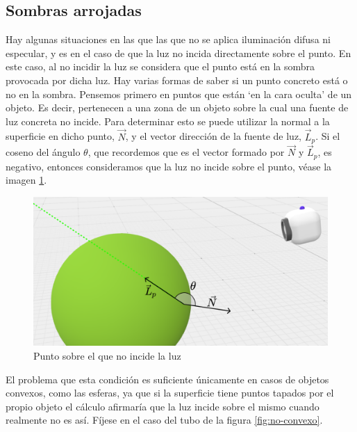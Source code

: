 \subsection{Sombras arrojadas}
\label{subsection:sombras}

Hay algunas situaciones en las que las que no se aplica iluminación difusa ni especular, y es en el caso de que la luz no incida directamente sobre el punto. En este caso, al no incidir la luz se considera que el punto está en la sombra provocada por dicha luz. Hay varias formas de saber si un punto concreto está o no en la sombra. Pensemos primero en puntos que están `en la cara oculta' de un objeto. Es decir, pertenecen a una zona de un objeto sobre la cual una fuente de luz concreta no incide. Para determinar esto se puede utilizar la normal a la superficie en dicho punto, $\vec N$, y el vector dirección de la fuente de luz, $\vec L_p$. Si el coseno del ángulo $\theta$, que recordemos que es el vector formado por $\vec N$ y $\vec L_p$, es negativo, entonces consideramos que la luz no incide sobre el punto, véase la imagen \ref{fig:excepcion}.

\begin{figure} [ht]
    \centering
    \includegraphics[scale = 0.25]{img/C8/excepcion.png}
    \caption{Punto sobre el que no incide la luz}
    \label{fig:excepcion}
\end{figure}

El problema que esta condición es suficiente únicamente en casos de objetos convexos, como las esferas, ya que si la superficie tiene puntos tapados por el propio objeto el cálculo afirmaría que la luz incide sobre el mismo cuando realmente no es así. Fíjese en el caso del tubo de la figura \ref{fig:no-convexo}.

